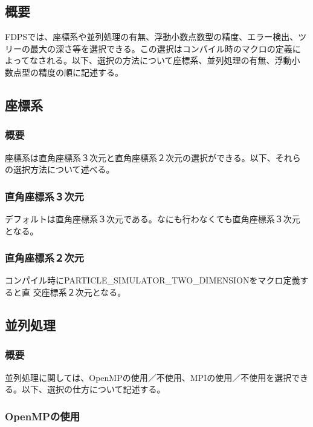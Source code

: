 \subsection{概要}

FDPSでは、座標系や並列処理の有無、浮動小数点数型の精度、エラー検出、ツ
リーの最大の深さ等を選択できる。この選択はコンパイル時のマクロの定義に
よってなされる。以下、選択の方法について座標系、並列処理の有無、浮動小
数点型の精度の順に記述する。

\subsection{座標系}
\label{sec:compile_coordinate}

\subsubsection{概要}

座標系は直角座標系３次元と直角座標系２次元の選択ができる。以下、それら
の選択方法について述べる。

\subsubsection{直角座標系３次元}

デフォルトは直角座標系３次元である。なにも行わなくても直角座標系３次元
となる。

\subsubsection{直角座標系２次元}

コンパイル時にPARTICLE\_SIMULATOR\_TWO\_DIMENSIONをマクロ定義すると直
交座標系２次元となる。

\subsection{並列処理}

\subsubsection{概要}

並列処理に関しては、OpenMPの使用／不使用、MPIの使用／不使用を選択でき
る。以下、選択の仕方について記述する。

\subsubsection{OpenMPの使用}

